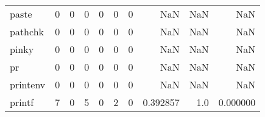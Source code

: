 \begin{longtable}{lrrrrrrrrr}
paste     &                                       0 &                                                  0 &                                                  0 &                                                  0 &                                                  0 &                                                  0 &                                                NaN &                                    NaN &                                  NaN \\
pathchk   &                                       0 &                                                  0 &                                                  0 &                                                  0 &                                                  0 &                                                  0 &                                                NaN &                                    NaN &                                  NaN \\
pinky     &                                       0 &                                                  0 &                                                  0 &                                                  0 &                                                  0 &                                                  0 &                                                NaN &                                    NaN &                                  NaN \\
pr        &                                       0 &                                                  0 &                                                  0 &                                                  0 &                                                  0 &                                                  0 &                                                NaN &                                    NaN &                                  NaN \\
printenv  &                                       0 &                                                  0 &                                                  0 &                                                  0 &                                                  0 &                                                  0 &                                                NaN &                                    NaN &                                  NaN \\
printf    &                                       7 &                                                  0 &                                                  5 &                                                  0 &                                                  2 &                                                  0 &                                           0.392857 &                                    1.0 &                             0.000000 \\

\end{longtable}
